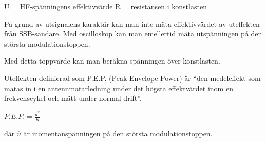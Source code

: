 U = HF-spänningens effektivvärde
R = resistansen i konstlasten

På grund av utsignalens karaktär kan man inte mäta effektivvärdet av uteffekten
från SSB-sändare. Med oscilloskop kan man emellertid mäta utspänningen på den
största modulationstoppen.

Med detta toppvärde kan man beräkna spänningen över konstlasten.

Uteffekten definierad som P.E.P. (Peak Envelope Power) är ``den medeleffekt som
matas in i en antennmatarledning under det högsta effektvärdet inom en
frekvenscykel och mätt under normal drift''.

\(P.E.P. = \frac{\hat{u}^2}{R}\)

där \(\hat{u}\) är momentanspänningen på den största modulationstoppen.

